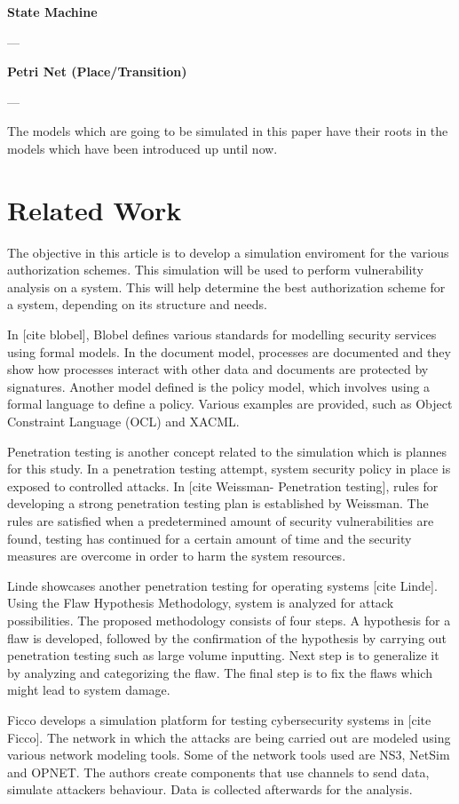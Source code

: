 \documentclass[11pt]{article} %
\begin{document}
\textbf{State Machine}

---

\textbf{Petri Net (Place/Transition)}

---

The models which are going to be simulated in this paper have their roots in the models which have been introduced up until now.  

\section{Related Work}

The objective in this article is to develop a simulation enviroment for the various authorization schemes. 
This simulation will be used to perform vulnerability analysis on a system. 
This will help determine the best authorization scheme for a system, depending on its structure and needs.

In [cite blobel], Blobel defines various standards for modelling security services using formal models. 
In the document model, processes are documented and they show how processes interact with other data and documents are protected by signatures. 
Another model defined is the policy model, which involves using a formal language to define a policy. 
Various examples are provided, such as Object Constraint Language (OCL) and XACML.

Penetration testing is another concept related to the simulation which is plannes for this study.
In a penetration testing attempt, system security policy in place is exposed to controlled attacks.
In [cite Weissman- Penetration testing], rules for developing a strong penetration testing plan is established by Weissman.
The rules are satisfied when a predetermined amount of security vulnerabilities are found, testing has continued for a certain amount of time and the security measures are overcome in order to harm the system resources.

Linde showcases another penetration testing for operating systems [cite Linde].
Using the Flaw Hypothesis Methodology, system is analyzed for attack possibilities.
The proposed methodology consists of four steps.
A hypothesis for a flaw is developed, followed by the confirmation of the hypothesis by carrying out penetration testing such as large volume inputting.
Next step is to generalize it by analyzing and categorizing the flaw.
The final step is to fix the flaws which might lead to system damage.

Ficco develops a simulation platform for testing cybersecurity systems in [cite Ficco]. 
The network in which the attacks are being carried out are modeled using various network modeling tools. 
Some of the network tools used are NS3, NetSim and OPNET. 
The authors create components that use channels to send data, simulate attackers behaviour. 
Data is collected afterwards for the analysis.
\end{document}
